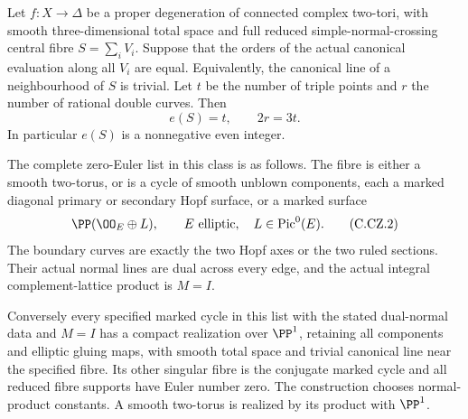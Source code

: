 
\begin{proposition}\label{cdp:st:C.2.UN.65}
Let $f:X\to\Delta$ be a proper degeneration of connected complex
two-tori, with smooth three-dimensional total space and full
reduced simple-normal-crossing central fibre
$S=\sum_iV_i$. Suppose that the orders of the actual canonical
evaluation along all $V_i$ are equal. Equivalently, the canonical
line of a neighbourhood of $S$ is trivial. Let $t$ be the number
of triple points and $r$ the number of rational double curves.
Then
\[
                         e(S)=t,\qquad 2r=3t.
\tag{C.CZ.1}\label{cdp:eq:C.CZ.1}
\]
In particular $e(S)$ is a nonnegative even integer.

The complete zero-Euler list in this class is as follows.
The fibre is either a smooth two-torus, or is a cycle of smooth
unblown components, each a marked diagonal primary or secondary
Hopf surface, or a marked surface
\[
                   \PP(\OO_E\oplus L),
          \qquad E\text{ elliptic},\quad L\in\operatorname{Pic}^0(E).
\tag{C.CZ.2}\label{cdp:eq:C.CZ.2}
\]
The boundary curves are exactly the two Hopf axes or the two
ruled sections. Their actual normal lines are dual across
every edge, and the actual integral complement-lattice product
is $M=I$.

Conversely every specified marked cycle in this list with
the stated dual-normal data and $M=I$ has a compact realization
over $\PP^1$, retaining all components and elliptic gluing
maps, with smooth total space and trivial canonical line
near the specified fibre. Its other singular fibre is the
conjugate marked cycle and all reduced fibre supports have
Euler number zero. The construction chooses normal-product
constants. A smooth two-torus is realized by its product
with $\PP^1$.
\end{proposition}

